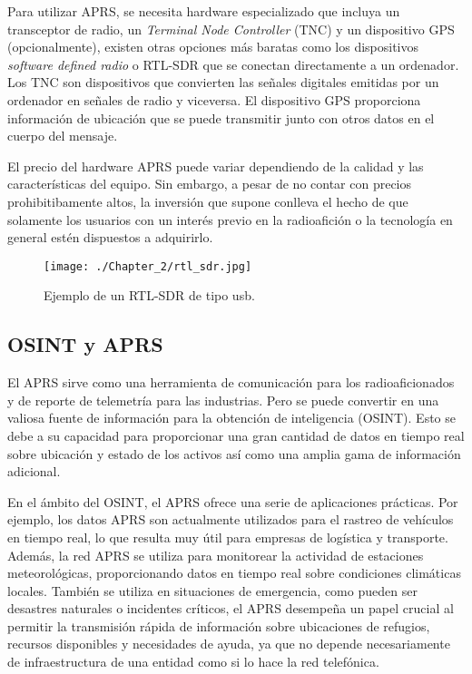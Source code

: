 Para utilizar APRS, se necesita hardware especializado que incluya un transceptor de radio, un \textit{Terminal Node Controller} (TNC) y un dispositivo GPS (opcionalmente), existen otras opciones más baratas como los dispositivos \textit{software defined radio} o RTL-SDR  que se conectan directamente a un ordenador. Los TNC son dispositivos que convierten las señales digitales emitidas por un ordenador en señales de radio y viceversa. El dispositivo GPS proporciona información de ubicación que se puede transmitir junto con otros datos en el cuerpo del mensaje.

El precio del hardware APRS puede variar dependiendo de la calidad y las características del equipo. Sin embargo, a pesar de no contar con precios prohibitibamente altos, la inversión que supone conlleva el hecho de que solamente los usuarios con un interés previo en la radioafición o la tecnología en general estén dispuestos a adquirirlo.

\begin{figure}
    \centering
    \texttt{[image: ./Chapter\_2/rtl\_sdr.jpg]}
    \caption{Ejemplo de un RTL-SDR de tipo usb.}
    \label{fig:rtl-sdr}
\end{figure}


\subsection{OSINT y APRS}

El APRS sirve como una herramienta de comunicación para los radioaficionados y de reporte de telemetría para las industrias. Pero se puede convertir en una valiosa fuente de información para la obtención de inteligencia (OSINT). Esto se debe a su capacidad para proporcionar una gran cantidad de datos en tiempo real sobre ubicación y estado de los activos así como una amplia gama de información adicional.

En el ámbito del OSINT, el APRS ofrece una serie de aplicaciones prácticas. Por ejemplo, los datos APRS son actualmente utilizados para el rastreo de vehículos en tiempo real, lo que resulta muy útil para empresas de logística y transporte. Además, la red APRS se utiliza para monitorear la actividad de estaciones meteorológicas, proporcionando datos en tiempo real sobre condiciones climáticas locales. También se utiliza en situaciones de emergencia, como pueden ser desastres naturales o incidentes críticos, el APRS desempeña un papel crucial al permitir la transmisión rápida de información sobre ubicaciones de refugios, recursos disponibles y necesidades de ayuda, ya que no depende necesariamente de infraestructura de una entidad como si lo hace la red telefónica.

